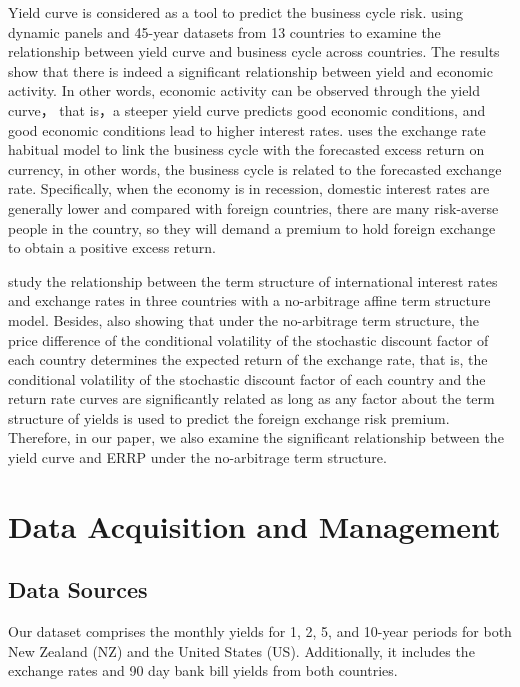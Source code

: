 \documentclass[10pt]{article}
\begin{document}
Yield curve is considered as a tool to predict the business cycle risk. \cite{hasse2022does} using dynamic panels and 45-year datasets from 13 countries to examine the relationship between yield curve and business cycle across countries. The results show that there is indeed a significant relationship between yield and economic activity. In other words, economic activity can be observed through the yield curve， that is，a steeper yield curve predicts good economic conditions, and good economic conditions lead to higher interest rates. \cite{riddiough2018business} uses the exchange rate habitual model to link the business cycle with the forecasted excess return on currency, in other words, the business cycle is related to the forecasted exchange rate. Specifically, when the economy is in recession, domestic interest rates are generally lower and compared with foreign countries, there are many risk-averse people in the country, so they will demand a premium to hold foreign exchange to obtain a positive excess return.

\cite{kaminska2013global} study the relationship between the term structure of international interest rates and exchange rates in three countries with  a no-arbitrage affine term structure model. Besides, \cite{ang2010yield} also showing that under the no-arbitrage term structure, the price difference of the conditional volatility of the stochastic discount factor of each country determines the expected return of the exchange rate, that is, the conditional volatility of the stochastic discount factor of each country and the return rate curves are significantly related as long as any factor about the term structure of yields is used to predict the foreign exchange risk premium. Therefore, in our paper, we also examine the significant relationship between the yield curve and ERRP under the no-arbitrage term structure.






\section{Data Acquisition and Management}

\subsection{Data Sources}
Our dataset comprises the monthly yields for 1, 2, 5, and 10-year periods for both New Zealand (NZ) and the United States (US). Additionally, it includes the exchange rates and 90 day bank bill yields from both countries.
\end{document}
